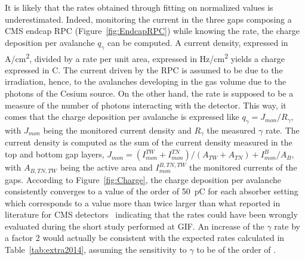 	It is likely that the rates obtained through fitting on normalized values is underestimated. Indeed, monitoring the current in the three gaps composing a CMS endcap RPC (Figure~\ref{fig:EndcapRPC}) while knowing the rate, the charge deposition per avalanche $q_\gamma$ can be computed. A current density, expressed in \si{A/cm^2}, divided by a rate per unit area, expressed in \si{Hz/cm^2} yields a charge expressed in \si{C}. The current driven by the RPC is assumed to be due to the irradiation, hence, to the avalanches developing in the gas volume due to the photons of the Cesium source. On the other hand, the rate is supposed to be a measure of the number of photons interacting with the detector. This way, it comes that the charge deposition per avalanche is expressed like $q_\gamma = J_{mon}/R_\gamma$, with $J_{mon}$ being the monitored current density and $R_\gamma$ the measured $\gamma$ rate. The current density is computed as the sum of the current density measured in the top and bottom gap layers, $J_{mon} = (I_{mon}^{TW}+I_{mon}^{TN})/(A_{TW}+A_{TN}) + I_{mon}^B/A_B$, with $A_{B,TN,TW}$ being the active area and $I_{mon}^{B,TN,TW}$ the monitored currents of the gaps. According to Figure~\ref{fig:Charge}, the charge deposition per avalanche consistently converges to a value of the order of \SI{50}{pC} for each absorber setting which corresponds to a value more than twice larger than what reported in literature for CMS detectors~\cite{PUGLIESE2002,PUGLIESE2003} indicating that the rates could have been wrongly evaluated during the short study performed at GIF. An increase of the $\gamma$ rate by a factor 2 would actually be consistent with the expected rates calculated in Table~\ref{tab:extra2014}, assuming the sensitivity to $\gamma$ to be of the order of .
	

